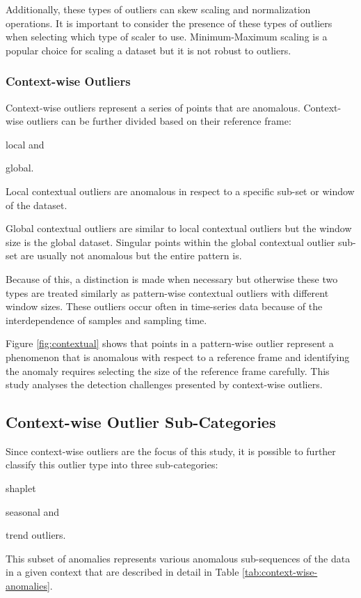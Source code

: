Additionally, these types of outliers can skew scaling and normalization operations. It is important to consider the presence of these types of outliers when selecting which type of scaler to use. Minimum-Maximum scaling is a popular choice for scaling a dataset but it is not robust to outliers.

\subsubsection{Context-wise Outliers}

Context-wise outliers represent a series of points that are anomalous. Context-wise outliers can be further divided based on their reference frame:
\begin{inlinelist}
    \item local and
    \item global.
\end{inlinelist}
Local contextual outliers are anomalous in respect to a specific sub-set or window of the dataset.

Global contextual outliers are similar to local contextual outliers but the window size is the global dataset. Singular points within the global contextual outlier sub-set are usually not anomalous but the entire pattern is.

Because of this, a distinction is made when necessary but otherwise these two types are treated similarly as pattern-wise contextual outliers with different window sizes.
These outliers occur often in time-series data because of the interdependence of samples and sampling time.

Figure \ref{fig:contextual} shows that points in a pattern-wise outlier represent a phenomenon that is anomalous with respect to a reference frame and identifying the anomaly requires selecting the size of the reference frame carefully. This study analyses the detection challenges presented by context-wise outliers.


\subsection{Context-wise Outlier Sub-Categories}

Since context-wise outliers are the focus of this study, it is possible to further classify this outlier type into three sub-categories:
\begin{inlinelist}
    \item shaplet
    \item seasonal and
    \item trend outliers.
\end{inlinelist}
This subset of anomalies represents various anomalous sub-sequences of the data in a given context that are described in detail in Table \ref{tab:context-wise-anomalies}.

